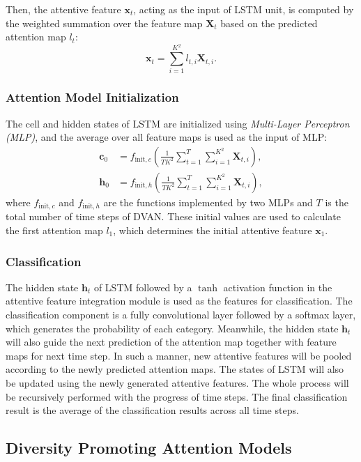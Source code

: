 \documentclass[journal]{IEEEtran}
\begin{document}
Then, the attentive feature $\mathbf{x}_t $, acting as the input of LSTM unit, is computed by the weighted summation over the feature map $\mathbf{X}_t$ based on the predicted attention map $l_t$:
\begin{equation}
  \mathbf{x}_t =\sum_{i=1}^{K^2}l_{t,i}\mathbf{X}_{t,i}.
  \label{eq:attention_pool}
\end{equation}

\subsubsection{Attention Model Initialization}
The cell and hidden states of LSTM are initialized using \emph{Multi-Layer Perceptron (MLP)}, and the average over all feature maps is used as the input of MLP:
\begin{align}
  \mathbf{c}_0&=f_{\text{init},c}\left(\frac{1}{TK^2}\sum^T_{t=1}\sum^{K^2}_{i=1}\mathbf{X}_{t,i}\right),\\
  \mathbf{h}_0&=f_{\text{init},h}\left(\frac{1}{TK^2}\sum^T_{t=1}\sum^{K^2}_{i=1}\mathbf{X}_{t,i}\right),
  \label{eq:h0}
\end{align}
where $f_{\text{init},c}$ and $f_{\text{init},h}$ are the functions implemented by two MLPs and $T$ is the total number of time steps of DVAN. These initial values are used to calculate the first attention map $l_1$, which determines the initial attentive feature $\mathbf{x}_1$.

\subsubsection{Classification}
The hidden state $\mathbf{h}_t$ of LSTM followed by a $\tanh$ activation function in the attentive feature integration module is used as the features for classification. The classification component is a fully convolutional layer followed by a softmax layer, which generates the probability of each category. Meanwhile, the hidden state $\mathbf{h}_t$ will also guide the next prediction of the attention map together with feature maps for next time step. In such a manner, new attentive features will be pooled according to the newly predicted attention maps. The states of LSTM will also be updated using the newly generated attentive features. The whole process will be recursively performed with the progress of time steps.
The final classification result is the average of the classification results across all time steps.

\subsection{Diversity Promoting Attention Models}
\label{sec:Diversity}
\end{document}
